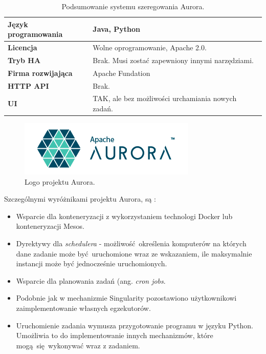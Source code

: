 \documentclass[10pt,a4paper,titlepage,twoside]{report}
\begin{document}
\begin{table}[!h]
\caption{Podsumowanie systemu szeregowania Aurora.}
\label{aurora_info}
\centering
\begin{tabular}{|p{4cm}|p{6cm}|}
  \hline
  \textbf{Język programowania} & Java, Python \\
  \hline
  \textbf{Licencja} & Wolne oprogramowanie, Apache 2.0. \\
  \hline
  \textbf{Tryb HA} & Brak. Musi zostać zapewniony innymi narzędziami. \\
  \hline
  \textbf{Firma rozwijająca} & Apache Fundation \\
  \hline
  \textbf{HTTP API} & Brak. \\
  \hline
  \textbf{UI} & TAK, ale bez możliwości urchamiania nowych zadań. \\
  \hline
\end{tabular}
\end{table}

\begin{figure}[!h]
	\centering
	\includegraphics[scale=1]{pics/aurora_logo.png}
	\caption{Logo projektu Aurora.}
	\label{aurora_logo}
\end{figure}

Szczególnymi wyróżnikami projektu Aurora, są \cite{ad41}:
\begin{itemize}
\item Wsparcie dla konteneryzacji z wykorzystaniem technologi Docker lub konteneryzacji Mesos.
\item Dyrektywy dla \textit{schedulera} - możliwość określenia komputerów na których dane zadanie może być uruchomione wraz ze wskazaniem, ile maksymalnie instancji może być jednocześnie uruchomionych.
\item Wsparcie dla planowania zadań (ang. \textit{cron jobs}.
\item Podobnie jak w mechanizmie Singularity pozostawiono użytkownikowi zaimplementowanie własnych egzekutorów.
\item Uruchomienie zadania wymusza przygotowanie programu w języku Python. Umożliwia to do implementowanie innych mechanizmów, które mogą się wykonywać wraz z zadaniem.
\end{itemize}
\end{document}
